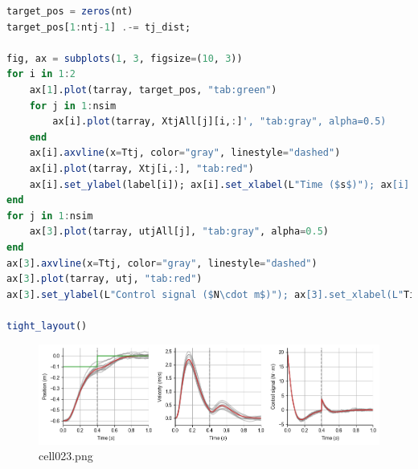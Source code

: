 \begin{lstlisting}[language=julia]
target_pos = zeros(nt)
target_pos[1:ntj-1] .-= tj_dist; 

fig, ax = subplots(1, 3, figsize=(10, 3))
for i in 1:2
    ax[1].plot(tarray, target_pos, "tab:green")
    for j in 1:nsim
        ax[i].plot(tarray, XtjAll[j][i,:]', "tab:gray", alpha=0.5)
    end
    ax[i].axvline(x=Ttj, color="gray", linestyle="dashed")
    ax[i].plot(tarray, Xtj[i,:], "tab:red")
    ax[i].set_ylabel(label[i]); ax[i].set_xlabel(L"Time ($s$)"); ax[i].set_xlim(0, T); ax[i].grid()
end
for j in 1:nsim
    ax[3].plot(tarray, utjAll[j], "tab:gray", alpha=0.5)
end
ax[3].axvline(x=Ttj, color="gray", linestyle="dashed")
ax[3].plot(tarray, utj, "tab:red")
ax[3].set_ylabel(L"Control signal ($N\cdot m$)"); ax[3].set_xlabel(L"Time ($s$)"); ax[3].set_xlim(0, T); ax[3].grid()

tight_layout()
\end{lstlisting}
\begin{figure}[ht]
	\centering
	\includegraphics[scale=0.8, max width=\linewidth]{./fig/motor-learning/infinite-horizon-ofc/cell023.png}
	\caption{cell023.png}
	\label{cell023.png}
\end{figure}
